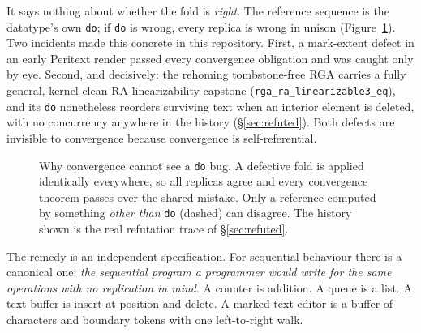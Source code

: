 \documentclass[11pt]{article}
\newcommand{\code}[1]{\texttt{#1}}
\newcommand{\del}{\mathsf{del}}
\newcommand{\ins}{\mathsf{ins}}
\begin{document}
It says nothing about whether the fold is \emph{right}. The reference
sequence is the datatype's own \code{do}; if \code{do} is wrong, every
replica is wrong in unison (Figure~\ref{fig:loop}). Two incidents made
this concrete in this repository. First, a mark-extent defect in an
early Peritext render passed every convergence obligation and was
caught only by eye. Second, and decisively: the rehoming tombstone-free
RGA carries a fully general, kernel-clean RA-linearizability capstone
(\code{rga\_ra\_linearizable3\_eq}), and its \code{do} nonetheless
reorders surviving text when an interior element is deleted, with no
concurrency anywhere in the history (\S\ref{sec:refuted}). Both
defects are invisible to convergence because convergence is
self-referential.

\begin{figure}[h]
\centering
{}
\caption{Why convergence cannot see a \code{do} bug. A defective fold
is applied identically everywhere, so all replicas agree and every
convergence theorem passes over the shared mistake. Only a reference
computed by something \emph{other than} \code{do} (dashed) can
disagree. The history shown is the real refutation trace of
\S\ref{sec:refuted}.}
\label{fig:loop}
\end{figure}

The remedy is an independent specification. For sequential behaviour
there is a canonical one: \emph{the sequential program a programmer
would write for the same operations with no replication in mind}. A
counter is addition. A queue is a list. A text buffer is
insert-at-position and delete. A marked-text editor is a buffer of
characters and boundary tokens with one left-to-right walk.
\end{document}
